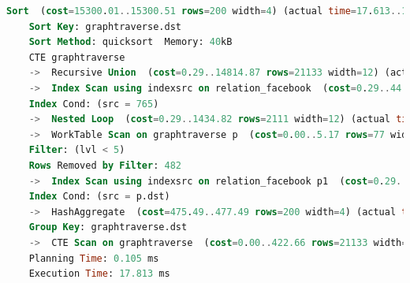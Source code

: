 \begin{lstlisting}[language=SQL,caption = Ausführungsplan Standard SQL,frame=single, label={2.AusführungsplanCTEFacebook.listing} ]
    Sort  (cost=15300.01..15300.51 rows=200 width=4) (actual time=17.613..17.622 rows=321 loops=1)
    Sort Key: graphtraverse.dst
    Sort Method: quicksort  Memory: 40kB
    CTE graphtraverse
    ->  Recursive Union  (cost=0.29..14814.87 rows=21133 width=12) (actual time=0.016..15.903 rows=6056 loops=1)
    ->  Index Scan using indexsrc on relation_facebook  (cost=0.29..44.00 rows=23 width=12) (actual time=0.015..0.020 rows=27 loops=1)
    Index Cond: (src = 765)
    ->  Nested Loop  (cost=0.29..1434.82 rows=2111 width=12) (actual time=0.019..2.130 rows=8173 loops=5)
    ->  WorkTable Scan on graphtraverse p  (cost=0.00..5.17 rows=77 width=8) (actual time=0.017..0.069 rows=729 loops=5)
    Filter: (lvl < 5)
    Rows Removed by Filter: 482
    ->  Index Scan using indexsrc on relation_facebook p1  (cost=0.29..18.23 rows=27 width=8) (actual time=0.001..0.002 rows=11 loops=3645)
    Index Cond: (src = p.dst)
    ->  HashAggregate  (cost=475.49..477.49 rows=200 width=4) (actual time=17.548..17.571 rows=321 loops=1)
    Group Key: graphtraverse.dst
    ->  CTE Scan on graphtraverse  (cost=0.00..422.66 rows=21133 width=4) (actual time=0.017..16.771 rows=6056 loops=1)
    Planning Time: 0.105 ms
    Execution Time: 17.813 ms
\end{lstlisting}


